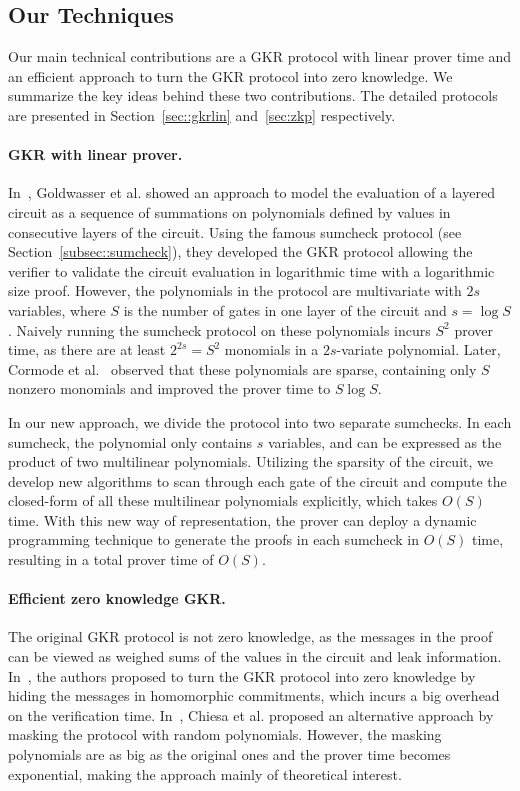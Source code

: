 \subsection{Our Techniques}
Our main technical contributions are a GKR protocol with linear prover time and an efficient approach to turn the GKR protocol into zero knowledge. We summarize the key ideas behind these two contributions. The detailed protocols are presented in Section~\ref{sec::gkrlin} and~\ref{sec:zkp} respectively.

\paragraph{GKR with linear prover.} In~\cite{GKR}, Goldwasser et al. showed an approach to model the evaluation of a layered circuit as a sequence of summations on polynomials defined by values in consecutive layers of the circuit. Using the famous sumcheck protocol (see Section~\ref{subsec::sumcheck}), they developed the GKR protocol allowing the verifier to validate the circuit evaluation in logarithmic time with a logarithmic size proof. However, the polynomials in the protocol are multivariate with $2s$ variables, where $S$ is the number of gates in one layer of the circuit and $s = \log S$. Naively running the sumcheck protocol on these polynomials incurs $S^2$ prover time, as there are at least $2^{2s}=S^2$ monomials in a $2s$-variate polynomial. Later, Cormode et al.~\cite{CMT} observed that these polynomials are sparse, containing only $S$ nonzero monomials and improved the prover time to $S\log S$.

In our new approach, we divide the protocol into two separate sumchecks. In each sumcheck, the polynomial only contains $s$ variables, and can be expressed as the product of two multilinear polynomials. Utilizing the sparsity of the circuit, we develop new algorithms to scan through each gate of the circuit and compute the closed-form of all these multilinear polynomials explicitly, which takes $O(S)$ time. With this new way of representation, the prover can deploy a dynamic programming technique to generate the proofs in each sumcheck in $O(S)$ time, resulting in a total prover time of $O(S)$. 

\paragraph{Efficient zero knowledge GKR.} The original GKR protocol is not zero knowledge, as the messages in the proof can be viewed as weighed sums of the values in the circuit and leak information. In~\cite{zkvpd,hyrax}, the authors proposed to turn the GKR protocol into zero knowledge by hiding the messages in homomorphic commitments, which incurs a big overhead on the verification time. In~\cite{zksumcheck}, Chiesa et al. proposed an alternative approach by masking the protocol with random polynomials. However, the masking polynomials are as big as the original ones and the prover time becomes exponential, making the approach mainly of theoretical interest. 

